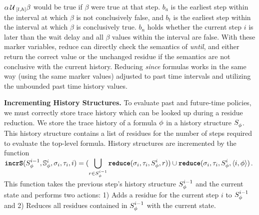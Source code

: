 $\alpha \until_{[l,h]} \beta$ would be true if $\beta$ were true at that step.
$b_a$ is the earliest step within the interval at which $\beta$ is not conclusively false,
and $b_t$ is the earliest step within the interval at which $\beta$ is conclusively true.
$b_n$ holds whether the current step $i$ is later than the wait delay and all $\beta$
values within the interval are false. With these marker variables, reduce can directly
check the semantics of \emph{until}, and either return the correct value or the unchanged
residue if the semantics are not conclusive with the current history. Reducing \emph{since}
formulas works in the same way (using the same marker values) adjusted to past time intervals
and utilizing the unbounded past time history values.


\textbf{Incrementing History Structures.}
To evaluate past and future-time policies, we must correctly store trace history which can be looked up during a residue reduction.
We store the trace history of a formula $\policyv$ in a history structure $\histst[\policyv]{}$.
This history structure contains a list of residues for the number of steps required to evaluate the top-level formula. History structures are incremented by the function
$\incrS(\histst[\policyv]{i-1}, \histSt[\policyv]{i}, \sigma_i, \tau_i, i) =
(\displaystyle\bigcup_{r \in \histst[\policyv]{i-1}} \reduce(\sigma_i, \tau_i, \histst[\policyv]{i}, r)) \cup
\reduce(\sigma_i, \tau_i, \histst[\policyv]{i}, \rp{i}{\policyv})$.
%
This function takes the previous step's history structure $\histst[\policyv]{i-1}$ and the current state
and performs two actions:
	1) Adds a residue for the current step $i$ to $\histst[\policyv]{i-1}$ and
	2) Reduces all residues contained in $\histst[\policyv]{i-1}$ with the current state.


